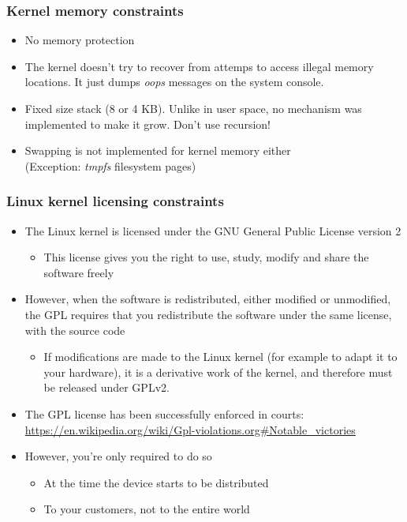 \begin{frame}
  \frametitle{Kernel memory constraints}
  \begin{itemize}
  \item No memory protection
  \item The kernel doesn't try to recover from attemps to access illegal
    memory locations. It just dumps {\em oops} messages on the system console.
  \item Fixed size stack (8 or 4 KB). Unlike in user space, no mechanism
    was implemented to make it grow. Don't use recursion!
  \item Swapping is not implemented for kernel memory either\\
    (Exception: {\em tmpfs} filesystem pages)
  \end{itemize}
\end{frame}

\begin{frame}
  \frametitle{Linux kernel licensing constraints}
  \begin{itemize}
  \item The Linux kernel is licensed under the GNU General Public
    License version 2
    \begin{itemize}
    \item This license gives you the right to use, study, modify and
      share the software freely
    \end{itemize}
  \item However, when the software is redistributed, either modified
    or unmodified, the GPL requires that you redistribute the software
    under the same license, with the source code
    \begin{itemize}
    \item If modifications are made to the Linux kernel (for example
      to adapt it to your hardware), it is a derivative work of the
      kernel, and therefore must be released under GPLv2.
    \end{itemize}
  \item The GPL license has been successfully enforced in courts:
    \url{https://en.wikipedia.org/wiki/Gpl-violations.org\#Notable\_victories}
  \item However, you're only required to do so
    \begin{itemize}
    \item At the time the device starts to be distributed
    \item To your customers, not to the entire world
    \end{itemize}
  \end{itemize}
\end{frame}

